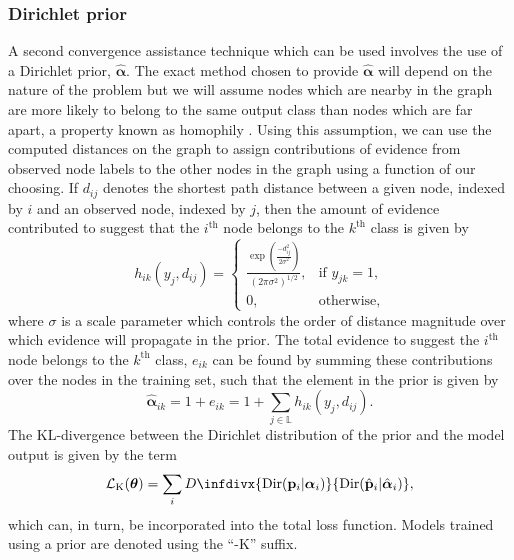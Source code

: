 \documentclass[
twocolumn,
]{ceurart}
\newcommand{\infdiv}{D\infdivx}
\begin{document}
\subsubsection{Dirichlet prior}
A second convergence assistance technique which can be used involves the use of a Dirichlet prior, $\hat{\boldsymbol{\alpha}}$.
The exact method chosen to provide $\hat{\boldsymbol{\alpha}}$ will depend on the nature of the problem but we will assume nodes which are nearby in the graph are more likely to belong to the same output class than nodes which are far apart, a property known as homophily \cite{HuangQian2019}.
Using this assumption, we can use the computed distances on the graph to assign contributions of evidence from observed node labels to the other nodes in the graph using a function of our choosing.
If $d_{ij}$ denotes the shortest path distance between a given node, indexed by $i$ and an observed node, indexed by $j$, then the amount of evidence contributed to suggest that the $i^\text{th}$ node belongs to the $k^\text{th}$ class is given by
\begin{equation}
    h_{ik}(y_j,d_{ij})=
    \begin{cases}
      \frac{\exp{\left(\frac{-d_{ij}^2}{2\sigma^2}\right)}}{\left(2\pi\sigma^2\right)^{1/2}}, & \text{if } y_{jk}=1,\\
    0, & \text{otherwise},
    \end{cases}
\end{equation}
where $\sigma$ is a scale parameter which controls the order of distance magnitude over which evidence will propagate in the prior.
The total evidence to suggest the $i^\text{th}$ node belongs to the $k^\text{th}$ class, $e_{ik}$ can be found by summing these contributions over the nodes in the training set, such that the element in the prior is given by 
\begin{equation}
    \hat{\boldsymbol{\alpha}}_{ik}=1+e_{ik}=1+\sum_{j\in\mathbb{L}}h_{ik}(y_j, d_{ij}).
\end{equation}
The KL-divergence between the Dirichlet distribution of the prior and the model output is given by the term
\begin{equation}
    \mathcal{L}_{\text{K}}(\boldsymbol{\theta})=\sum_i\infdiv{\text{Dir}(\mathbf{p}_i\vert\boldsymbol{\alpha}_i)}{\text{Dir}(\hat{\mathbf{p}}_i\vert\hat{\boldsymbol{\alpha}}_i)},
\label{eq::teacher_loss}
\end{equation}
which can, in turn, be incorporated into the total loss function.
Models trained using a prior are denoted using the ``-K'' suffix.
\end{document}
